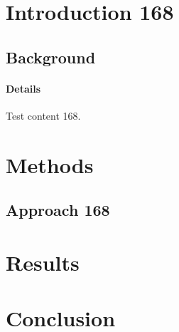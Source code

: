 \documentclass{article}
\begin{document}
\section{Introduction 168}
\subsection{Background}
\paragraph{Details} Test content 168.
\section{Methods}
\subsection{Approach 168}
\section{Results}
\section{Conclusion}
\end{document}
